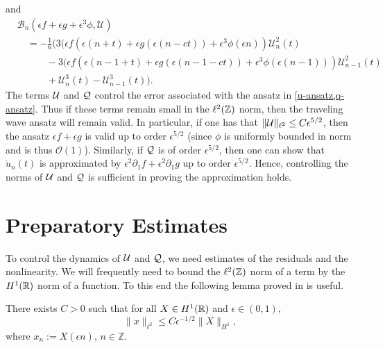 and 
\begin{equation}
\begin{aligned}
	&\mathcal B_n(\epsilon f + \epsilon g + \epsilon^3 \phi, \mathcal U) \\
	&\quad= -\frac 1 6 \Big( 3(\epsilon f(\epsilon(n+t) + \epsilon g(\epsilon(n-ct)) + \epsilon^3 \phi(\epsilon n))  \mathcal U^2_n(t) \\
	&\quad \qquad - 3(\epsilon f(\epsilon(n-1+t) + \epsilon g(\epsilon(n-1-ct)) + \epsilon^3 \phi(\epsilon (n-1)))  \mathcal U^2_{n-1}(t) \\
	&\quad\qquad + \mathcal U_n^3(t)  - \mathcal U_{n-1}^3(t)\Big).
\end{aligned}
\end{equation}
The terms \(\mathcal{U}\) and \(\mathcal{Q}\) control the error associated with the ansatz in \cref{u-ansatz,q-ansatz}. Thus if these terms remain small in the \(\ell^2(\mathbb{Z})\) norm, then the traveling wave ansatz will remain valid. In particular, if one has that \(\|\mathcal{U}\|_{\ell^2} \leq C\epsilon^{5/2}\), then the ansatz \(\epsilon f + \epsilon g\) is valid up to order \(\epsilon^{5/2}\) (since \(\phi\) is uniformly bounded in norm and is thus \(\mathcal O (1)\)). Similarly, if \(\mathcal{Q}\) is of order \(\epsilon^{5/2}\), then one can show that \(\dot u_n(t)\) is approximated by \(\epsilon^2 \partial_1 f + \epsilon^2 \partial_1 g\) up to order \(\epsilon^{5/2}\). Hence, controlling the norms of \(\mathcal{U}\) and \(\mathcal{Q}\) is sufficient in proving the approximation holds.

\section{Preparatory Estimates}
 
To control the dynamics of \(\mathcal{U}\) and \(\mathcal{Q}\), we need estimates of the residuals and the nonlinearity. We will frequently need to bound the \(\ell^2(\mathbb{Z})\) norm of a term by the \(H^1(\mathbb{R})\) norm of a function. To this end the following lemma proved in \cite{dumas2014justification} is useful.
\begin{lem}\label{h1-ell2-ineq}
	There exists \(C>0\) such that for all \(X \in H^1(\mathbb{R})\) and \(\epsilon \in (0,1)\), \[\|x\|_{\ell^2} \leq C \epsilon^{-1/2} \|X\|_{H^1},\] where \(x_n := X(\epsilon n)\), \(n\in \mathbb Z\).
\end{lem}


